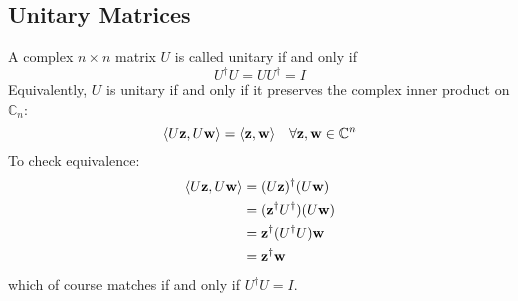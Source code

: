 \subsection{Unitary Matrices}
A complex \(n \times n\) matrix \(U\) is called unitary if and only if
\[
	U^\dagger U = U U^\dagger = I
\]
Equivalently, \(U\) is unitary if and only if it preserves the complex inner product on \(\mathbb C_n\):
\[
	\langle U \vb z, U \vb w \rangle = \langle \vb z, \vb w \rangle\quad \forall \vb z, \vb w \in \mathbb C^n
\]
To check equivalence:
\begin{align*}
	\langle U \vb z, U \vb w \rangle & = (U \vb z)^\dagger (U \vb w)         \\
	                                 & = (\vb z^\dagger U^\dagger) (U \vb w) \\
	                                 & = \vb z^\dagger (U^\dagger U) \vb w   \\
	                                 & = \vb z^\dagger \vb w
\end{align*}
which of course matches if and only if \(U^\dagger U = I\).
